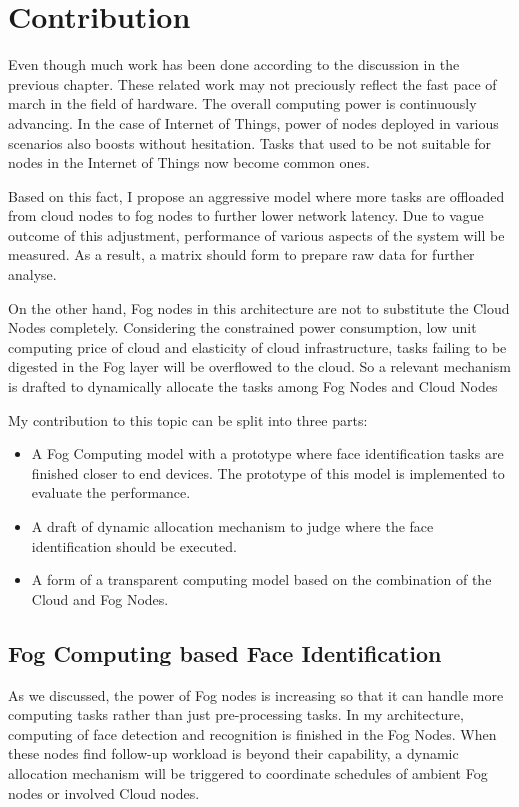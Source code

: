 \chapter{Contribution} \label{chap:contribution}

Even though much work has been done according to the discussion in the previous chapter. These related work may not preciously reflect the fast pace of march in the field of hardware. The overall computing power is continuously advancing. In the case of Internet of Things, power of nodes deployed in various scenarios also boosts without hesitation. Tasks that used to be not suitable for nodes in the Internet of Things now become common ones. 

Based on this fact, I propose an aggressive model where more tasks are offloaded from cloud nodes to fog nodes to further lower network latency. Due to vague outcome of this adjustment, performance of various aspects of the system will be measured. As a result, a matrix should form to prepare raw data for further analyse.

On the other hand, Fog nodes in this architecture are not to substitute the Cloud Nodes completely. Considering the constrained power consumption, low unit computing price of cloud and elasticity of cloud infrastructure, tasks failing to be digested in the Fog layer will be overflowed to the cloud. So a relevant mechanism is drafted to dynamically allocate the tasks among Fog Nodes and Cloud Nodes

My contribution to this topic can be split into three parts:
\begin{itemize}
    \item A Fog Computing model with a prototype where face identification tasks are finished closer to end devices. The prototype of this model is implemented to evaluate the performance.
    \item A draft of dynamic allocation mechanism to judge where the face identification should be executed.
   \item A form of a transparent computing model based on the combination of the Cloud and Fog Nodes.
\end{itemize}

\section{Fog Computing based Face Identification}
As we discussed, the power of Fog nodes is increasing so that it can handle more computing tasks rather than just pre-processing tasks. In my architecture, computing of face detection and recognition is finished in the Fog Nodes. When these nodes find follow-up workload is beyond their capability, a dynamic allocation mechanism will be triggered to coordinate schedules of ambient Fog nodes or involved Cloud nodes. 

